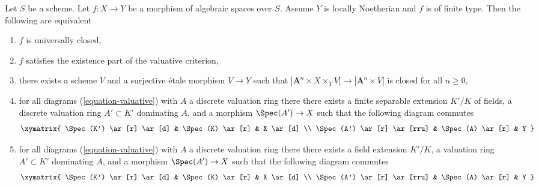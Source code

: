 \begin{lemma}
\label{lemma-check-universally-closed-Noetherian}
Let $S$ be a scheme. Let $f : X \to Y$ be a morphism of algebraic
spaces over $S$. Assume $Y$ is locally Noetherian and $f$ is
of finite type. Then the following are equivalent
\begin{enumerate}
\item $f$ is universally closed,
\item $f$ satisfies the existence part of the valuative criterion,
\item there exists a scheme $V$ and a surjective \'etale morphism
$V \to Y$ such that
$|\mathbf{A}^n \times X \times_Y V| \to |\mathbf{A}^n \times V|$ is closed
for all $n \geq 0$,
\item for all diagrams (\ref{equation-valuative}) with $A$ a discrete
valuation ring there there exists a finite separable extension $K'/K$
of fields, a discrete valuation ring $A' \subset K'$ dominating $A$, and
a morphism $\Spec(A') \to X$ such that the following diagram commutes
$$
\xymatrix{
\Spec(K') \ar[r] \ar[d] & \Spec(K) \ar[r] & X \ar[d] \\
\Spec(A') \ar[r] \ar[rru] & \Spec(A) \ar[r] & Y
}
$$
\item for all diagrams (\ref{equation-valuative}) with $A$ a discrete
valuation ring there there exists a field extension $K'/K$,
a valuation ring $A' \subset K'$ dominating $A$, and
a morphism $\Spec(A') \to X$ such that the following diagram commutes
$$
\xymatrix{
\Spec(K') \ar[r] \ar[d] & \Spec(K) \ar[r] & X \ar[d] \\
\Spec(A') \ar[r] \ar[rru] & \Spec(A) \ar[r] & Y
}
$$
\end{enumerate}
\end{lemma}

